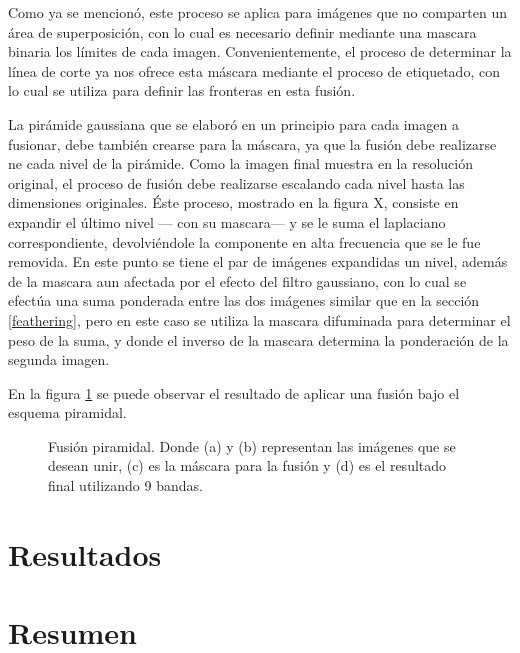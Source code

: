 Como ya se mencionó, este proceso se aplica para imágenes que no comparten un área de superposición, con lo cual es necesario definir mediante una mascara binaria los límites de cada imagen. Convenientemente, el proceso de determinar la línea de corte ya nos ofrece esta máscara mediante el proceso de etiquetado, con lo cual se utiliza para definir las fronteras en esta fusión.

La pirámide gaussiana que se elaboró en un principio para cada imagen a fusionar, debe también crearse para la máscara, ya que la fusión debe realizarse ne cada nivel de la pirámide. Como la imagen final muestra en la resolución original, el proceso de fusión debe realizarse escalando cada nivel hasta las dimensiones originales. Éste proceso, mostrado en la figura X, consiste en expandir el último nivel --- con su mascara--- y se le suma el laplaciano correspondiente, devolviéndole la componente en alta frecuencia que se le fue removida. En este punto se tiene el par de imágenes expandidas un nivel, además de la mascara aun afectada por el efecto del filtro gaussiano, con lo cual se efectúa una suma ponderada entre las dos imágenes similar que en la sección \ref{feathering}, pero en este caso se utiliza la mascara difuminada para determinar el peso de la suma, y donde el inverso de la mascara determina la ponderación de la segunda imagen.

En la figura \ref{imagen:blend-apple} se puede observar el resultado de aplicar una fusión bajo el esquema piramidal.

\begin{figure}[H]
	\centering     %
	
	
	\caption[Fusion piramidal]{Fusión piramidal. Donde (a) y (b) representan las imágenes que se desean unir, (c) es la máscara para la fusión y (d) es el resultado final utilizando 9 bandas.}
	\label{imagen:blend-apple}
\end{figure}

\section{Resultados}

\section{Resumen}


